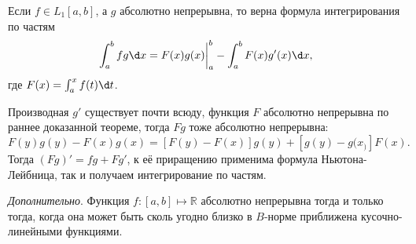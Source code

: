 

\begin{to_con}
    Если $f \in L_1 [a, b]$, а $g$ абсолютно непрерывна, то верна формула интегрирования по частям
    \begin{equation*}
        \int_a^b f g \d x = F(x) g(x) \bigg|_a^b
        - \int_a^b F(x) g'(x) \d x,
    \end{equation*}
    где $F(x) = \int_a^x f(t) \d t$.
\end{to_con}

\begin{uproof}
    Производная $g'$ существует почти всюду, функция $F$ абсолютно непрерывна по раннее доказанной теореме, тогда $Fg$ тоже абсолютно непрерывна:
    \begin{equation*}
        F(y) g(y) - F(x) g(x) = \left[
            F(y) - F(x)
        \right] g(y) + 
        \left[
            g(y) - g(x_)
        \right] F(x).
    \end{equation*}
    Тогда $(Fg)' = fg + F g'$, к её приращению применима формула Ньютона-Лейбница, так и получаем интегрирование по частям. 
\end{uproof}

\textit{Дополнительно}. 
    Функция $f \colon [a, b] \mapsto \mathbb{R}$ абсолютно непрерывна тогда и только тогда, когда она может быть сколь угодно близко в $B$-норме приближена кусочно-линейными функциями.


